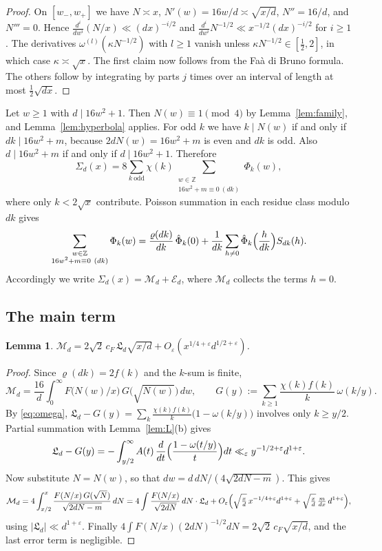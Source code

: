 \documentclass[11pt]{amsart}
\newtheorem{lemma}[theorem]{Lemma}
\theoremstyle{remark}
\theoremstyle{definition}
\numberwithin{equation}{section}
\newcommand{\Z}{\mathbb{Z}}
\newcommand{\eps}{\varepsilon}
\newcommand{\Lf}{\mathfrak{L}}
\begin{document}
\begin{proof}
On $[w_-,w_+]$ we have $N\asymp x$, $N'(w)=16w/d\asymp\sqrt{x/d}$, $N''=16/d$, and $N'''=0$. Hence $\frac{d^i}{dw^i}(N/x)\ll(dx)^{-i/2}$ and $\frac{d^i}{dw^i}N^{-1/2}\ll x^{-1/2}(dx)^{-i/2}$ for $i\ge1$. The derivatives $\omega^{(l)}(\kappa N^{-1/2})$ with $l\ge1$ vanish unless $\kappa N^{-1/2}\in[\frac12,2]$, in which case $\kappa\asymp\sqrt x$. The first claim now follows from the Fa\`a di Bruno formula. The others follow by integrating by parts $j$ times over an interval of length at most $\frac12\sqrt{dx}$.
\end{proof}

Let $w\ge1$ with $d\mid16w^2+1$. Then $N(w)\equiv1\pmod 4$ by Lemma~\ref{lem:family}, and Lemma~\ref{lem:hyperbola} applies. For odd $k$ we have $k\mid N(w)$ if and only if $dk\mid 16w^2+m$, because $2dN(w)=16w^2+m$ is even and $dk$ is odd. Also $d\mid 16w^2+m$ if and only if $d\mid16w^2+1$. Therefore
\begin{equation}\label{eq:Sigma2}
\Sigma_d(x)=8\sum_{k\ \mathrm{odd}}\chi(k)\sum_{\substack{w\in\Z\\ 16w^2+m\equiv0\ (dk)}}\Phi_k(w),
\end{equation}
where only $k<2\sqrt x$ contribute. Poisson summation in each residue class modulo $dk$ gives
\[
\sum_{\substack{w\in\Z\\ 16w^2+m\equiv0\ (dk)}}\Phi_k(w)=\frac{\varrho(dk)}{dk}\,\hat\Phi_k(0)+\frac1{dk}\sum_{h\ne0}\hat\Phi_k\Bigl(\frac h{dk}\Bigr)S_{dk}(h).
\]
Accordingly we write $\Sigma_d(x)=\mathcal M_d+\mathcal E_d$, where $\mathcal M_d$ collects the terms $h=0$.

\subsection{The main term}

\begin{lemma}\label{lem:main}
$\mathcal M_d=2\sqrt2\,c_F\,\Lf_d\sqrt{x/d}+O_\eps(x^{1/4+\eps}d^{1/2+\eps})$.
\end{lemma}

\begin{proof}
Since $\varrho(dk)=2f(k)$ and the $k$-sum is finite,
\[
\mathcal M_d=\frac{16}{d}\int_0^\infty F\bigl(N(w)/x\bigr)\,G\bigl(\sqrt{N(w)}\bigr)\,dw,\qquad G(y):=\sum_{k\ge1}\frac{\chi(k)f(k)}{k}\,\omega(k/y).
\]
By \eqref{eq:omega}, $\Lf_d-G(y)=\sum_k\frac{\chi(k)f(k)}k\bigl(1-\omega(k/y)\bigr)$ involves only $k\ge y/2$. Partial summation with Lemma~\ref{lem:L}(b) gives
\[
\Lf_d-G(y)=-\int_{y/2}^\infty A(t)\,\frac{d}{dt}\Bigl(\frac{1-\omega(t/y)}{t}\Bigr)dt\ll_\eps y^{-1/2+\eps}d^{1+\eps}.
\]
Now substitute $N=N(w)$, so that $dw=d\,dN/(4\sqrt{2dN-m})$. This gives
\[
\mathcal M_d=4\int_{x/2}^{x}\frac{F(N/x)\,G(\sqrt N)}{\sqrt{2dN-m}}\,dN
=4\int\frac{F(N/x)}{\sqrt{2dN}}\,dN\cdot\Lf_d+O_\eps\Bigl(\sqrt{\tfrac xd}\,x^{-1/4+\eps}d^{1+\eps}+\sqrt{\tfrac xd}\,\tfrac{m}{dx}\,d^{1+\eps}\Bigr),
\]
using $|\Lf_d|\ll d^{1+\eps}$. Finally $4\int F(N/x)(2dN)^{-1/2}dN=2\sqrt2\,c_F\sqrt{x/d}$, and the last error term is negligible.
\end{proof}
\end{document}
